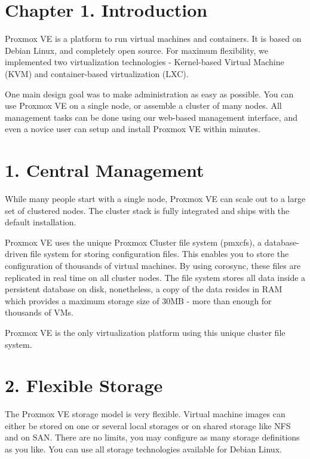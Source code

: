 \section{Chapter 1. Introduction}

Proxmox VE is a platform to run virtual machines and containers. It is based on Debian Linux, and completely open source. For maximum flexibility, we implemented two virtualization technologies - Kernel-based Virtual Machine (KVM) and container-based virtualization (LXC).

One main design goal was to make administration as easy as possible. You can use Proxmox VE on a single node, or assemble a cluster of many nodes. All management tasks can be done using our web-based management interface, and even a novice user can setup and install Proxmox VE within minutes.


\section{1. Central Management}

While many people start with a single node, Proxmox VE can scale out to a large set of clustered nodes. The cluster stack is fully integrated and ships with the default installation.

Proxmox VE uses the unique Proxmox Cluster file system (pmxcfs), a database-driven file system for storing configuration files. This enables you to store the configuration of thousands of virtual machines. By using corosync, these files are replicated in real time on all cluster nodes. The file system stores all data inside a persistent database on disk, nonetheless, a copy of the data resides in RAM which provides a maximum storage size of 30MB - more than enough for thousands of VMs.

Proxmox VE is the only virtualization platform using this unique cluster file system.


\section{2. Flexible Storage}

The Proxmox VE storage model is very flexible. Virtual machine images can either be stored on one or several local storages or on shared storage like NFS and on SAN. There are no limits, you may configure as many storage definitions as you like. You can use all storage technologies available for Debian Linux.

